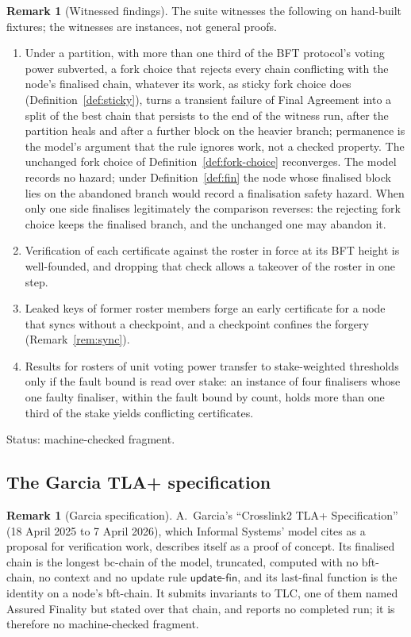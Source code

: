 \documentclass[11pt,a4paper]{article}
\theoremstyle{definition}
\newtheorem{remark}[theorem]{Remark}
\newcommand{\updatefin}{\mathsf{update\text{-}fin}}
\begin{document}
\begin{remark}[Witnessed findings]\label{rem:mc-zq-findings}
The suite witnesses the following on hand-built fixtures; the witnesses are
instances, not general proofs.
\begin{enumerate}[label=(\arabic*)]
\item Under a partition, with more than one third of the BFT protocol's
  voting power subverted, a fork choice that rejects every chain
  conflicting with the node's finalised chain, whatever its work, as sticky
  fork choice does (Definition~\ref{def:sticky}), turns a transient failure
  of Final Agreement into a split of the best chain that persists to the end
  of the witness run, after the partition heals and after a further block on
  the heavier branch; permanence is the model's argument that the rule
  ignores work, not a checked property. The unchanged fork choice of
  Definition~\ref{def:fork-choice} reconverges. The model records no hazard;
  under Definition~\ref{def:fin} the node whose finalised block lies on the
  abandoned branch would record a finalisation safety hazard. When only one
  side finalises legitimately the comparison reverses: the rejecting fork choice
  keeps the finalised branch, and the unchanged one may abandon it.
\item Verification of each certificate against the roster in force at its
  BFT height is well-founded, and dropping that check allows a takeover of
  the roster in one step.
\item Leaked keys of former roster members forge an early certificate for a
  node that syncs without a checkpoint, and a checkpoint confines the
  forgery (Remark~\ref{rem:sync}).
\item Results for rosters of unit voting power transfer to stake-weighted
  thresholds only if the fault bound is read over stake: an instance of four
  finalisers whose one faulty finaliser, within the fault bound by count,
  holds more than one third of the stake yields conflicting certificates.
\end{enumerate}

Status: machine-checked fragment.
\end{remark}

\subsection{The Garcia TLA+ specification}\label{sec:mc-tla}

\begin{remark}[Garcia specification]\label{rem:mc-tla}
A.~Garcia's ``Crosslink2 TLA+ Specification'' (18 April 2025 to 7 April
2026), which Informal Systems' model cites as a proposal for verification
work, describes itself as a proof of concept. Its finalised chain is the
longest bc-chain of the model, truncated, computed with no bft-chain, no
context and no update rule $\updatefin$, and its last-final function is the
identity on a node's bft-chain. It submits invariants to TLC, one of them
named Assured Finality but stated over that chain, and reports no completed
run; it is therefore no machine-checked fragment.
\end{remark}
\end{document}
